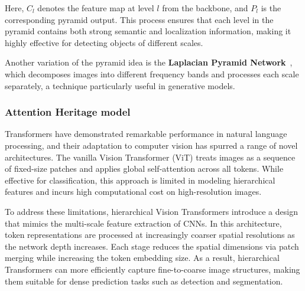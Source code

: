 Here, \( C_l \) denotes the feature map at level \( l \) from the backbone, and \( P_l \) is the corresponding pyramid output. This process ensures that each level in the pyramid contains both strong semantic and localization information, making it highly effective for detecting objects of different scales.

Another variation of the pyramid idea is the \textbf{Laplacian Pyramid Network}~\cite{denton2015deep}, which decomposes images into different frequency bands and processes each scale separately, a technique particularly useful in generative models.

\subsubsection{Attention Heritage model}

Transformers have demonstrated remarkable performance in natural language processing, and their adaptation to computer vision has spurred a range of novel architectures. The vanilla Vision Transformer (ViT) treats images as a sequence of fixed-size patches and applies global self-attention across all tokens. While effective for classification, this approach is limited in modeling hierarchical features and incurs high computational cost on high-resolution images.

To address these limitations, hierarchical Vision Transformers introduce a design that mimics the multi-scale feature extraction of CNNs. In this architecture, token representations are processed at increasingly coarser spatial resolutions as the network depth increases. Each stage reduces the spatial dimensions via patch merging while increasing the token embedding size. As a result, hierarchical Transformers can more efficiently capture fine-to-coarse image structures, making them suitable for dense prediction tasks such as detection and segmentation.
